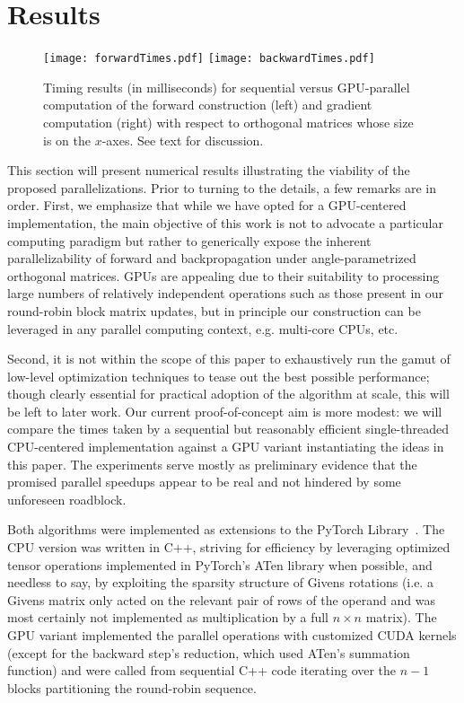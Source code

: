 \documentclass[superscriptaddress,floatfix]{article}
\begin{document}
\section{Results}
\label{sec:Results}
\begin{figure*}
  \centering
  \texttt{[image: forwardTimes.pdf]}
  \texttt{[image: backwardTimes.pdf]}
  \caption{Timing results (in milliseconds) for sequential versus
    GPU-parallel computation of the forward construction (left) and
    gradient computation (right) with respect to orthogonal matrices
    whose size is on the $x$-axes. See text for discussion.}
  \label{fig:resultsTiming}
\end{figure*}

This section will present numerical results illustrating the viability
of the proposed parallelizations. Prior to turning to the details, a
few remarks are in order. First, we emphasize that while we have
opted for a GPU-centered implementation, the main objective of this
work is not to advocate a particular computing paradigm but rather to
generically expose the inherent parallelizability of forward and
backpropagation under angle-parametrized orthogonal matrices. GPUs
are appealing due to their suitability to processing large numbers of
relatively independent operations such as those present in our
round-robin block matrix updates, but in principle our construction
can be leveraged in any parallel computing context, e.g. multi-core
CPUs, etc.

Second, it is not within the scope of this paper to exhaustively run
the gamut of low-level optimization techniques to tease out the best
possible performance; though clearly essential for practical adoption
of the algorithm at scale, this will be left to later work. Our
current proof-of-concept aim is more modest: we will compare the times
taken by a sequential but reasonably efficient single-threaded
CPU-centered implementation against a GPU variant instantiating the
ideas in this paper. The experiments serve mostly as preliminary
evidence that the promised parallel speedups appear to be real and not
hindered by some unforeseen roadblock.

Both algorithms were implemented as extensions to the PyTorch
Library~\cite{paszke2019pytorch}. The CPU version was written in C++,
striving for efficiency by leveraging optimized tensor operations
implemented in PyTorch's ATen library when possible, and needless to
say, by exploiting the sparsity structure of Givens rotations (i.e. a
Givens matrix only acted on the relevant pair of rows of the operand
and was most certainly not implemented as multiplication by a full
$n \times n$ matrix). The GPU variant implemented the parallel
operations with customized CUDA kernels (except for the backward
step's reduction, which used ATen's summation function) and were
called from sequential C++ code iterating over the $n-1$ blocks
partitioning the round-robin sequence.
\end{document}
